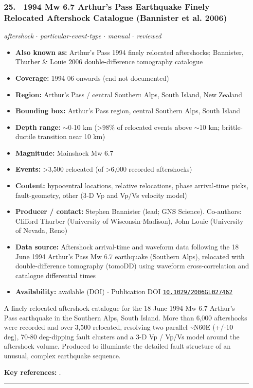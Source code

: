 \documentclass[10pt,a4paper]{article}
\newcommand{\catentryrule}{\par\vspace{3pt}\noindent\textcolor{rulegrey}{\rule{\linewidth}{0.3pt}}\par\vspace{5pt}}
\newcommand{\kv}[2]{\item \textbf{#1:} #2}
\begin{document}
\subsubsection*{\hypertarget{c:25}{25.}~ 1994 Mw 6.7 Arthur's Pass Earthquake Finely Relocated Aftershock Catalogue (Bannister et al. 2006)}
{\small\itshape aftershock $\cdot$ particular-event-type $\cdot$ manual $\cdot$ reviewed}\par\vspace{2pt}
\begin{itemize}[leftmargin=1.3em,itemsep=0.6pt,topsep=1pt,parsep=0pt]
\kv{Also known as}{Arthur's Pass 1994 finely relocated aftershocks; Bannister, Thurber \& Louie 2006 double-difference tomography catalogue}
\kv{Coverage}{1994-06 onwards (end not documented)}
\kv{Region}{Arthur's Pass / central Southern Alps, South Island, New Zealand}
\kv{Bounding box}{Arthur's Pass region, central Southern Alps, South Island}
\kv{Depth range}{$\sim$0-10 km (\textgreater{}98\% of relocated events above $\sim$10 km; brittle-ductile transition near 10 km)}
\kv{Magnitude}{Mainshock Mw 6.7}
\kv{Events}{\textgreater{}3,500 relocated (of \textgreater{}6,000 recorded aftershocks)}
\kv{Content}{hypocentral locations, relative relocations, phase arrival-time picks, fault-geometry, other (3-D Vp and Vp/Vs velocity model)}
\kv{Producer / contact}{Stephen Bannister (lead; GNS Science). Co-authors: Clifford Thurber (University of Wisconsin-Madison), John Louie (University of Nevada, Reno)}
\kv{Data source}{Aftershock arrival-time and waveform data following the 18 June 1994 Arthur's Pass Mw 6.7 earthquake (Southern Alps), relocated with double-difference tomography (tomoDD) using waveform cross-correlation and catalogue differential times}
\kv{Availability}{available (DOI) $\cdot$ Publication DOI \href{https://doi.org/10.1029/2006GL027462}{\nolinkurl{10.1029/2006GL027462}}}
\end{itemize}
\par\vspace{2pt}A finely relocated aftershock catalogue for the 18 June 1994 Mw 6.7 Arthur's Pass earthquake in the Southern Alps, South Island. More than 6,000 aftershocks were recorded and over 3,500 relocated, resolving two parallel \textasciitilde{}N60E (+/-10 deg), 70-80 deg-dipping fault clusters and a 3-D Vp / Vp/Vs model around the aftershock volume. Produced to illuminate the detailed fault structure of an unusual, complex earthquake sequence.
\par\vspace{2pt}\textbf{Key references:} \cite{Bannister2006}.
\catentryrule
\end{document}
